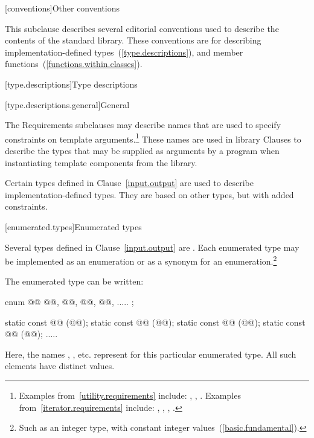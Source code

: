 [conventions]{Other conventions}
%

\pnum
This subclause describes several editorial conventions used to describe the contents
of the \Cpp standard library.
These conventions are for describing
implementation-defined types~(\ref{type.descriptions}),
and member functions~(\ref{functions.within.classes}).

[type.descriptions]{Type descriptions}

[type.descriptions.general]{General}

\pnum
The Requirements subclauses may describe names that are used to specify
constraints on template arguments.\footnote{Examples
from~\ref{utility.requirements} include:
,
,
.
Examples from~\ref{iterator.requirements} include:
,
,
,
.}
These names are used in library Clauses
to describe the types that
may be supplied as arguments by a \Cpp program when instantiating template components from
the library.

\pnum
Certain types defined in Clause~\ref{input.output} are used to describe implementation-defined types.
%
They are based on other types, but with added constraints.

[enumerated.types]{Enumerated types}

\pnum
Several types defined in Clause~\ref{input.output} are
.
%
Each enumerated type may be implemented as an enumeration or as a synonym for
an enumeration.\footnote{Such as an integer type, with constant integer
values~(\ref{basic.fundamental}).}

\pnum
The enumerated type  can be written:

\begin{codeblock}
enum @@ { @@, @@, @@, @@, ..... };

static const @@ (@@);
static const @@ (@@);
static const @@ (@@);
static const @@ (@@);
  .....
\end{codeblock}

\pnum
Here, the names , , etc. represent
for this particular enumerated type.
%
All such elements have distinct values.

